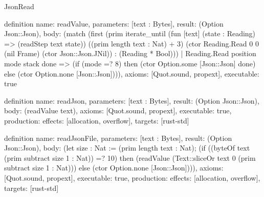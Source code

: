 \begin{lexlean}{JsonRead}
\begin{semanticmodule}
definition{
  name: readValue,
  parameters: [text : Bytes],
  result: (Option Json::Json),
  body: (match (first (prim iterate_until (fun [text] (state : Reading) => (readStep text state)) ((prim length text : Nat) + 3) (ctor Reading.Read 0 0 (nil Frame) (ctor Json::Json.JNil)) : (Reading * Bool)))
    | Reading.Read position mode stack done => (if (mode =? 8) then (ctor Option.some [Json::Json] done) else (ctor Option.none [Json::Json]))),
  axioms: [Quot.sound, propext],
  executable: true
}

definition{
  name: readJson,
  parameters: [text : Bytes],
  result: (Option Json::Json),
  body: (readValue text),
  axioms: [Quot.sound, propext],
  executable: true,
  production: {effects: [allocation, overflow], targets: [rust-std]}
}

definition{
  name: readJsonFile,
  parameters: [text : Bytes],
  result: (Option Json::Json),
  body: (let size : Nat := (prim length text : Nat); (if ((byteOf text (prim subtract size 1 : Nat)) =? 10) then (readValue (Text::sliceOr text 0 (prim subtract size 1 : Nat))) else (ctor Option.none [Json::Json]))),
  axioms: [Quot.sound, propext],
  executable: true,
  production: {effects: [allocation, overflow], targets: [rust-std]}
}
\end{semanticmodule}
\end{lexlean}
